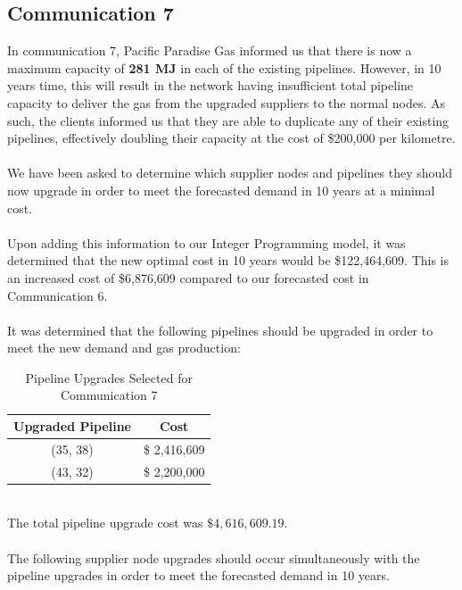 \documentclass{article}
\begin{document}
\subsection{Communication 7}
In communication 7, Pacific Paradise Gas informed us that there is now a maximum capacity of \textbf{281 MJ} in each of the existing pipelines. However, in 10 years time, this will result in the network having insufficient total pipeline capacity to deliver the gas from the upgraded suppliers to the normal nodes. As such, the clients informed us that they are able to duplicate any of their existing pipelines, effectively doubling their capacity at the cost of \$200,000 per kilometre.\\
\\
We have been asked to determine which supplier nodes and pipelines they should now upgrade in order to meet the forecasted demand in 10 years at a minimal cost.\\
\\
Upon adding this information to our Integer Programming model, it was determined that the new optimal cost in 10 years would be \$122,464,609. This is an increased cost of \$6,876,609 compared to our forecasted cost in Communication 6. \\
\\
It was determined that the following pipelines should be upgraded in order to meet the new demand and gas production:
\bigskip
\renewcommand\baselinestretch{1.5}
\begin{table}[htb]
    \centering
    \color{black}
    \begin{tabular}{|c:c|}
        \hline
        \textbf{Upgraded Pipeline} & \textbf{Cost} \\ \hline
        (35, 38) & \$ 2,416,609 \\ \hdashline
        (43, 32) & \$ 2,200,000 \\
        \hline
    \end{tabular}
    \caption{Pipeline Upgrades Selected for Communication 7}
    \label{tab:upgradepipeoptscomm7}
\end{table}
\renewcommand\baselinestretch{1}
\bigskip
\\
\noindent
The total pipeline upgrade cost was \(\$ 4,616,609.19\).\\
\\
The following supplier node upgrades should occur simultaneously with the pipeline upgrades in order to meet the forecasted demand in 10 years.
\renewcommand\baselinestretch{1.5}
\end{document}
